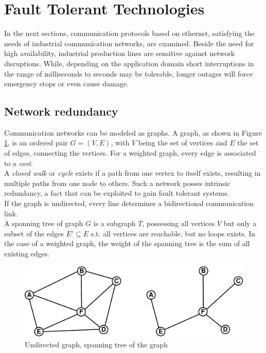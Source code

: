 \section{Fault Tolerant Technologies}
In the next sections, communication protocols based on ethernet, satisfying the needs of industrial communication networks, are examined. Beside the need for high availability,
industrial production lines
are sensitive against network disruptions. While, depending on the application domain short interruptions in the range of milliseconds to seconds may be
tolerable, longer outages will force emergency stops or even cause damage.

\subsection{Network redundancy}

Communication networks can be modeled as graphs. A graph, as shown in Figure \ref{fig:graph}, is an ordered pair $G=(V,E)$, with $V$ being the set of vertices and $E$
the set of edges, connecting the vertices. For a weighted graph, every edge is associated to a \textit{cost}. 
\\
A \textit{closed walk} or \textit{cycle} exists if a path from one vertex to itself exists, resulting in multiple paths from one node to others.
Such a network posses intrinsic redundancy, a fact that can be exploited to gain fault tolerant systems.
\\
If the graph is undirected, every line determines a bidirectional communication link. 
\\
A spanning tree of graph $G$ is a subgraph $T$, possessing all vertices $V$ but only a subset of the edges $E' \subseteq E$ s.t. all vertices are reachable,
but no loops exists. In the case of a weighted graph, the weight of the spanning tree is the sum of all existing edges.
\begin{figure}[H]
\centering
 \includegraphics[width=0.8\linewidth]{figures/graph.eps}
 \caption{Undirected graph, spanning tree of the graph}
\label{fig:graph}
\end{figure}

